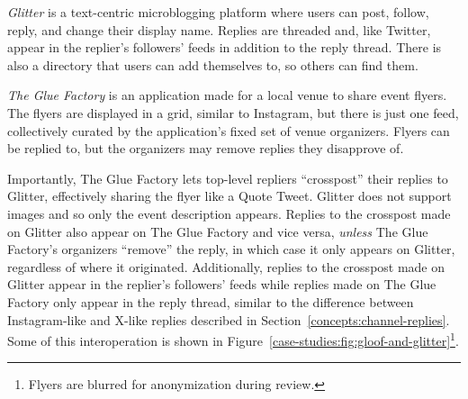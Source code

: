 \emph{Glitter} is a text-centric microblogging platform
where users can post, follow, reply, and change their display name.
Replies are threaded and, like Twitter, appear in the replier's followers' feeds in addition to the reply thread.
There is also a directory that users can add themselves to,
so others can find them.

\emph{The Glue Factory} is an application made for a local
venue to share event flyers.
The flyers are displayed in a grid, similar to Instagram,
but there is just one feed, collectively curated by
the application's fixed set of venue organizers.
Flyers can be replied to, but the organizers may remove replies they disapprove of.

Importantly, The Glue Factory lets
top-level repliers ``crosspost'' their replies
to Glitter, effectively sharing the flyer like a Quote Tweet.
Glitter does not support images and so only the
event description appears.
Replies to the crosspost made on Glitter also appear on The Glue Factory
and vice versa, \emph{unless} The Glue Factory's organizers ``remove'' the reply,
in which case it only appears on Glitter, regardless of where it originated.
Additionally, replies to the crosspost made on Glitter appear in the replier's followers'
feeds while replies made on The Glue Factory only appear in the reply thread,
similar to the difference between Instagram-like and X-like replies described in Section~\ref{concepts:channel-replies}.
Some of this interoperation is shown in Figure~\ref{case-studies:fig:gloof-and-glitter}\footnote{
Flyers are blurred for anonymization during review.
}.


